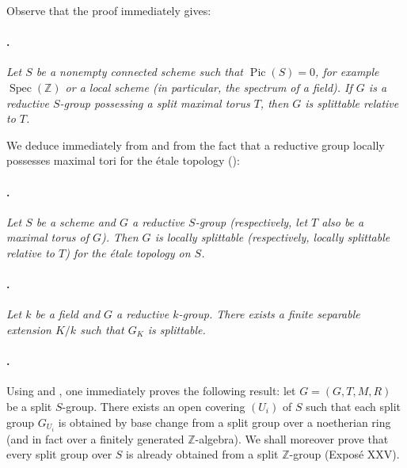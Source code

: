 Observe that the proof immediately gives:

\paragraph{.}
\textit{Let \(S\) be a nonempty connected scheme such that
\(\operatorname{Pic}(S)=0\), for example
\(\operatorname{Spec}(\mathbb Z)\) or a local scheme
\textup{(in particular, the spectrum of a field)}. If \(G\) is a
reductive \(S\)-group possessing a split maximal torus \(T\), then
\(G\) is splittable relative to \(T\).}

We deduce immediately from  and from the fact that a reductive
group locally possesses maximal tori for the étale topology
\textup{()}:

\paragraph{.}
\textit{Let \(S\) be a scheme and \(G\) a reductive \(S\)-group
\textup{(respectively, let \(T\) also be a maximal torus of \(G\))}.
Then \(G\) is locally splittable
\textup{(respectively, locally splittable relative to \(T\))}
for the étale topology on \(S\).}

\paragraph{.}
\textit{Let \(k\) be a field and \(G\) a reductive \(k\)-group.
There exists a finite separable extension \(K/k\) such that \(G_K\)
is splittable.}

\paragraph{.}
Using  and , one immediately proves the
following result: let \(G=(G,T,M,R)\) be a split \(S\)-group. There
exists an open covering \((U_i)\) of \(S\) such that each split group
\(G_{U_i}\) is obtained by base change from a split group over a
noetherian ring \textup{(and in fact over a finitely generated
\(\mathbb Z\)-algebra)}. We shall moreover prove that every split
group over \(S\) is already obtained from a split
\(\mathbb Z\)-group \textup{(Exposé XXV)}.

